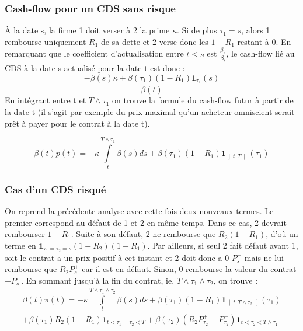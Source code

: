 \documentclass[a4paper]{article}
\begin{document}
\subsubsection{Cash-flow pour un CDS sans risque}
À la date s, la firme 1 doit verser à 2 la prime $\kappa$.
 Si de plus $\tau_1 = s$, alors 1 rembourse uniquement $R_1$ de sa dette et 2 verse donc les $1-R_1$ restant à 0.
 En remarquant que le coefficient d'actualisation entre $t\leq s$ est $\frac{\beta_{s}}{\beta_{t}}$, le cash-flow lié au CDS à la date s actualisé pour la date t est donc : 
\begin{equation*}
\frac{- \beta(s) \kappa+ \beta(\tau_{1}) \left( 1 - R_{1} \right)  \mathbf{ 1 }_{\tau_{1} } \left( s \right) }{\beta (t)} 
\end{equation*}
En intégrant entre t et $T \wedge \tau_{1}$ on trouve la formule du cash-flow futur à partir de la date t (il s'agit par exemple du prix maximal qu'un acheteur omniscient serait prêt à payer pour le contrat à la date t).

\begin{equation}
\beta (t) p(t) = -\kappa \int\limits_{t}^{T \wedge \tau_{1}} \beta(s)ds + \beta(\tau_{1})\left( 1 - R_{1} \right)\mathbf{ 1 }_{\left] t, T \right[}(\tau_{1})
\end{equation}
\subsubsection{Cas d'un CDS risqué}
On reprend la précédente analyse avec cette fois deux nouveaux termes.
 Le premier correspond au défaut de 1 et 2 en même temps.
 Dans ce cas, 2 devrait rembourser $1-R_{1}$.
 Suite à son défaut, 2 ne rembourse que $R_{2}(1-R_{1})$, d'où un terme en $\mathbf{1}_{\tau_{1} = \tau_{2} = s} (1-R_{2})(1-R_{1})$.
 Par ailleurs, si seul 2 fait défaut avant 1, soit le contrat a un prix positif à cet instant et 2 doit donc a 0 $P_{s}^{+}$ mais ne lui rembourse que $R_{2}P_{s}^{+}$ car il est en défaut.
 Sinon, 0 rembourse la valeur du contrat $-P_{s}^{-}$.
 En sommant jusqu'à la fin du contrat, ie.
 $T \wedge \tau_{1} \wedge \tau_{2}$, on trouve :
\begin{multline}
\beta(t)\pi(t) = -\kappa \int\limits_{t}^{T \wedge \tau_{1} \wedge \tau_{2}} \beta(s)ds + \beta\left(\tau_{1}\right)\left( 1 - R_{1} \right)\mathbf{ 1 }_{\left] t, T \wedge \tau_{2} \right[}(\tau_{1}) \\
+ \beta(\tau_{1}) R_{2} \left( 1 - R_{1} \right) \mathbf{1}_{t < \tau_{1} = \tau_{2} < T} 
+ \beta(\tau_{2}) \left( R_{2}P_{\tau_{2}}^{+} - P_{\tau_{2}}^{-} \right) \mathbf{1}_{t < \tau_{2} < T \wedge \tau_{1}}
\end{multline}
\pagebreak
\end{document}
